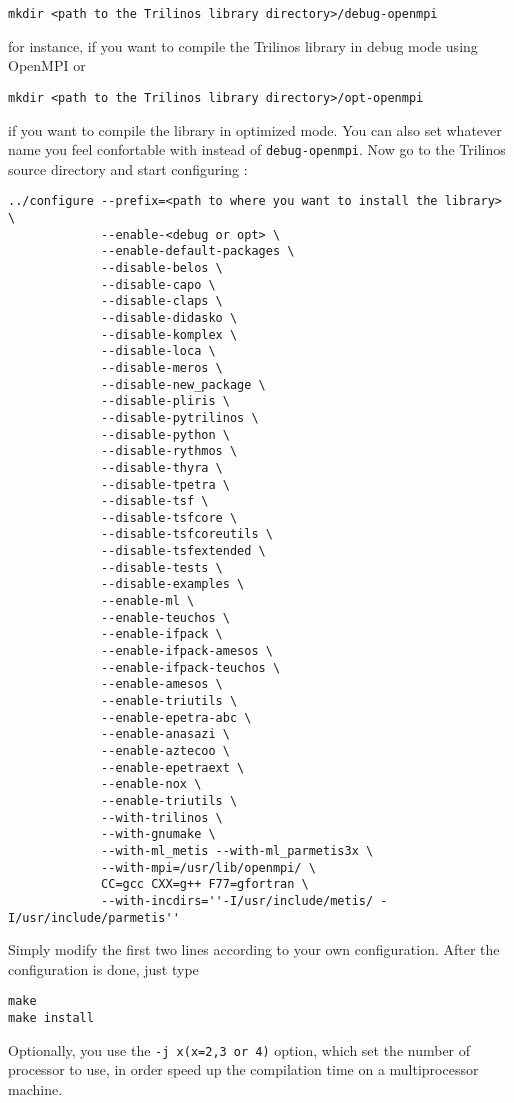 \begin{verbatim}
mkdir <path to the Trilinos library directory>/debug-openmpi
\end{verbatim}

for instance, if you want to compile the Trilinos library in debug mode using OpenMPI or

\begin{verbatim}
mkdir <path to the Trilinos library directory>/opt-openmpi
\end{verbatim}

if you want to compile the library in optimized mode. You can also set whatever name you feel confortable with instead of \verb!debug-openmpi!.
Now go to the Trilinos source directory and start configuring :

\begin{verbatim}
../configure --prefix=<path to where you want to install the library> \
             --enable-<debug or opt> \
             --enable-default-packages \
             --disable-belos \
             --disable-capo \
             --disable-claps \
             --disable-didasko \
             --disable-komplex \
             --disable-loca \
             --disable-meros \
             --disable-new_package \
             --disable-pliris \
             --disable-pytrilinos \
             --disable-python \
             --disable-rythmos \
             --disable-thyra \
             --disable-tpetra \
             --disable-tsf \
             --disable-tsfcore \
             --disable-tsfcoreutils \
             --disable-tsfextended \
             --disable-tests \
             --disable-examples \
             --enable-ml \
             --enable-teuchos \
             --enable-ifpack \
             --enable-ifpack-amesos \
             --enable-ifpack-teuchos \
             --enable-amesos \
             --enable-triutils \
             --enable-epetra-abc \
             --enable-anasazi \
             --enable-aztecoo \
             --enable-epetraext \
             --enable-nox \
             --enable-triutils \
             --with-trilinos \
             --with-gnumake \
             --with-ml_metis --with-ml_parmetis3x \
             --with-mpi=/usr/lib/openmpi/ \
             CC=gcc CXX=g++ F77=gfortran \
             --with-incdirs=''-I/usr/include/metis/ -I/usr/include/parmetis''
\end{verbatim}
Simply modify the first two lines according to your own configuration.
After the configuration is done, just type
\begin{verbatim}
make
make install
\end{verbatim}
Optionally, you use the \verb!-j x(x=2,3 or 4)! option, which set the number of processor to use,
in order speed up the compilation time on a multiprocessor machine.

